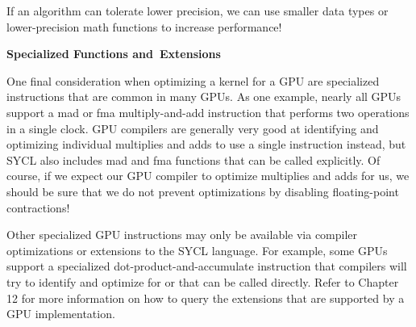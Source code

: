 \begin{tcolorbox}[colback=red!5!white,colframe=red!75!black]
If an algorithm can tolerate lower precision, we can use smaller data types or lower-precision math functions to increase performance!
\end{tcolorbox}

\hspace*{\fill} \par %
\textbf{Specialized Functions and Extensions}

One final consideration when optimizing a kernel for a GPU are specialized instructions that are common in many GPUs. As one example, nearly all GPUs support a mad or fma multiply-and-add instruction that performs two operations in a single clock. GPU compilers are generally very good at identifying and optimizing individual multiplies and adds to use a single instruction instead, but SYCL also includes mad and fma functions that can be called explicitly. Of course, if we expect our GPU compiler to optimize multiplies and adds for us, we should be sure that we do not prevent optimizations by disabling floating-point contractions!\par

Other specialized GPU instructions may only be available via compiler optimizations or extensions to the SYCL language. For example, some GPUs support a specialized dot-product-and-accumulate instruction that compilers will try to identify and optimize for or that can be called directly. Refer to Chapter 12 for more information on how to query the extensions that are supported by a GPU implementation.\par